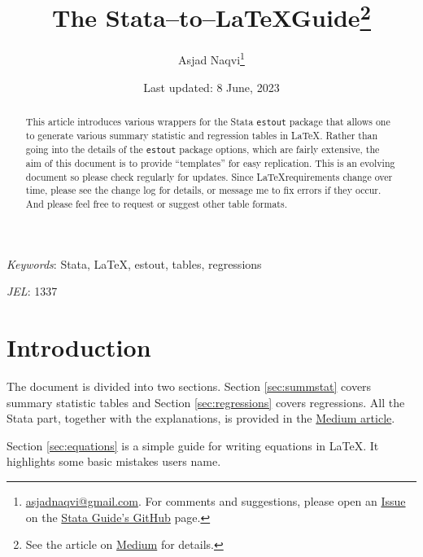 \documentclass[11pt]{article}
\title{The Stata--to--\LaTeX Guide\thanks{See the article on \href{https://medium.com/the-stata-guide/the-stata-to-latex-guide-6e7ed5622856}{Medium} for details.}}
\author{
    Asjad Naqvi\thanks{\href{mailto:asjadnaqvi@gmail.com}{asjadnaqvi@gmail.com}. For comments and suggestions, please open an \href{https://github.com/asjadnaqvi/The-Stata-Guide/issues}{Issue} on the \href{https://github.com/asjadnaqvi/The-Stata-Guide}{Stata Guide's GitHub} page. }
    }
\date{Last updated: 8 June, 2023}
\numberwithin{table}{section}   %
\begin{document}
\maketitle

\begin{abstract}
This article introduces various wrappers for the Stata \texttt{estout} package \citep{Jann2005,Jann2007} that allows one to generate various summary statistic and regression tables in \LaTeX. Rather than going into the details of the \texttt{estout} package options, which are fairly extensive, the aim of this document is to provide ``templates'' for easy  replication. This is an evolving document so please check regularly for updates. Since \LaTeX requirements change over time, please see the change log for details, or message me to fix errors if they occur. And please feel free to request or suggest other table formats. 
\end{abstract}

\vspace{4ex}
\small{\textit{Keywords}: Stata, \LaTeX, estout, tables, regressions}

\small{\textit{JEL}: 1337}


\newpage


\tableofcontents

\listoftables

\newpage
\section*{Introduction}
The document is divided into two sections. Section \ref{sec:summstat} covers summary statistic tables and Section \ref{sec:regressions} covers regressions. All the Stata part, together with the explanations, is provided in the \href{https://medium.com/the-stata-guide/the-stata-to-latex-guide-6e7ed5622856}{Medium article}. 

Section \ref{sec:equations} is a simple guide for writing equations in \LaTeX. It highlights some basic mistakes users name.

\vspace{5pt}
\end{document}
